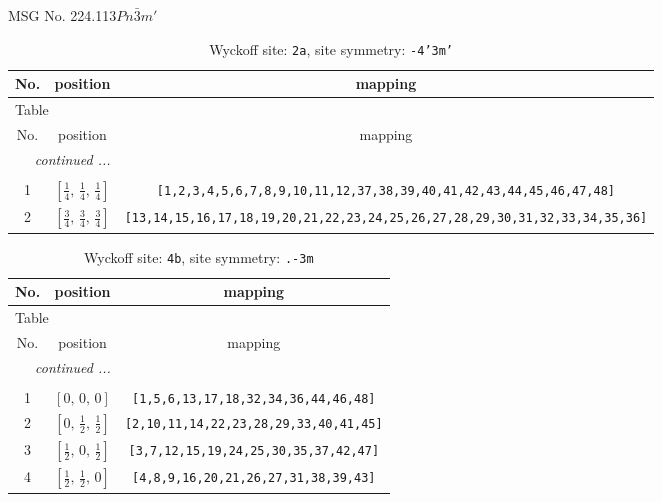 \documentclass[fleqn,8pt]{jsarticle}
\begin{document}
\setcounter{MaxMatrixCols}{32}

\renewcommand{\tablename}{Table~}
\renewcommand{\figurename}{Figure~}
\begin{center}
\LARGE
MSG No. 224.113\quad$Pn\bar{3}m'$
\end{center}
\renewcommand{\arraystretch}{1.2}
\begin{longtable}{ccc}
\caption{Wyckoff site: {\tt 2a}, site symmetry: {\tt -4'3m'}}
 \\
 \hline \hline
No. & position & mapping \\ \hline \endfirsthead

\multicolumn{2}{l}{\tablename\ \thetable{}} \\
 \hline \hline
No. & position & mapping \\ \hline \endhead

 \hline \hline
\multicolumn{2}{r}{\footnotesize\it continued ...} \\ \endfoot

 \hline \hline
\multicolumn{2}{r}{} \\ \endlastfoot

1 & $\left[ \frac{1}{4},\, \frac{1}{4},\, \frac{1}{4} \right]$ & {\tt [1,2,3,4,5,6,7,8,9,10,11,12,37,38,39,40,41,42,43,44,45,46,47,48]} \\ \hline
2 & $\left[ \frac{3}{4},\, \frac{3}{4},\, \frac{3}{4} \right]$ & {\tt [13,14,15,16,17,18,19,20,21,22,23,24,25,26,27,28,29,30,31,32,33,34,35,36]} \\
\end{longtable}
\renewcommand{\arraystretch}{1.2}
\begin{longtable}{ccc}
\caption{Wyckoff site: {\tt 4b}, site symmetry: {\tt .-3m}}
 \\
 \hline \hline
No. & position & mapping \\ \hline \endfirsthead

\multicolumn{2}{l}{\tablename\ \thetable{}} \\
 \hline \hline
No. & position & mapping \\ \hline \endhead

 \hline \hline
\multicolumn{2}{r}{\footnotesize\it continued ...} \\ \endfoot

 \hline \hline
\multicolumn{2}{r}{} \\ \endlastfoot

1 & $\left[ 0,\, 0,\, 0 \right]$ & {\tt [1,5,6,13,17,18,32,34,36,44,46,48]} \\ \hline
2 & $\left[ 0,\, \frac{1}{2},\, \frac{1}{2} \right]$ & {\tt [2,10,11,14,22,23,28,29,33,40,41,45]} \\ \hline
3 & $\left[ \frac{1}{2},\, 0,\, \frac{1}{2} \right]$ & {\tt [3,7,12,15,19,24,25,30,35,37,42,47]} \\ \hline
4 & $\left[ \frac{1}{2},\, \frac{1}{2},\, 0 \right]$ & {\tt [4,8,9,16,20,21,26,27,31,38,39,43]} \\
\end{longtable}
\end{document}
